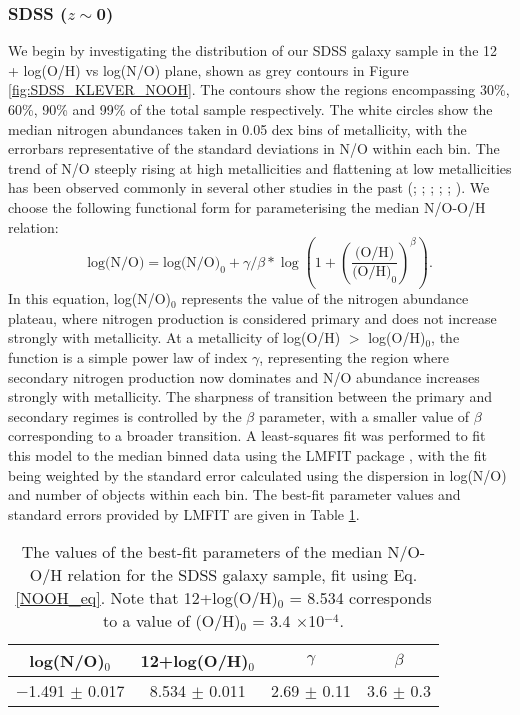 \documentclass[usenatbib]{mnras} %
\begin{document}
\subsubsection{SDSS ($z\sim$0)}
We begin by investigating the distribution of our SDSS galaxy sample in the 12 + log(O/H) vs log(N/O) plane, shown as grey contours in Figure \ref{fig:SDSS_KLEVER_NOOH}. The contours show the regions encompassing 30\%, 60\%, 90\% and 99\% of the total sample respectively. The white circles show the median nitrogen abundances taken in 0.05 dex bins of metallicity, with the errorbars representative of the standard deviations in N/O within each bin. The trend of N/O steeply rising at high metallicities and flattening at low metallicities has been observed commonly in several other studies in the past (\citealt{VilaCostas_1993}; \citealt{vanZee_1998}; \citealt{HenryWorthy_1999}; \citealt{PMC_2009}; \citealt{Pilyugin_2012}; \citealt{AndrewsMartini_2013}).
We choose the following functional form for parameterising the median N/O-O/H relation:
\begin{equation}\label{NOOH_eq}
\text{log(N/O)} = \text{log(N/O)}_0 + \gamma/\beta * \log\left(1 + \left(\frac{\text{(O/H)}}{\text{(O/H)}_0}\right)^\beta\right).
\end{equation}
In this equation, log(N/O)$_0$ represents the value of the nitrogen abundance plateau, where nitrogen production is considered primary and does not increase strongly with metallicity. At a metallicity of log(O/H) $>$ log(O/H)$_0$, the function is a simple power law of index $\gamma$, representing the region where secondary nitrogen production now dominates and N/O abundance increases strongly with metallicity. The sharpness of transition between the primary and secondary regimes is controlled by the $\beta$ parameter, with a smaller value of $\beta$ corresponding to a broader transition. A least-squares fit was performed to fit this model to the median binned data using the LMFIT package \citep[][]{Newville_2016}, with the fit being weighted by the standard error calculated using the dispersion in log(N/O) and number of objects within each bin. The best-fit parameter values and standard errors provided by LMFIT are given in Table \ref{tab:NOOH_best}. 

\begin{table}
 \centering
 \caption{The values of the best-fit parameters of the median N/O-O/H relation for the SDSS galaxy sample, fit using Eq. \ref{NOOH_eq}. Note that 12+log(O/H)$_0$ = 8.534 corresponds to a value of (O/H)$_0$ = 3.4 $\times$10$^{-4}$.}
 \label{tab:NOOH_best}
 \begin{tabular}{cccc}
  \hline
  \hline
  log(N/O)$_0$ & 12+log(O/H)$_0$ & $\gamma$ & $\beta$\\
  \hline
  $-$1.491 $\pm$ 0.017 & 8.534 $\pm$ 0.011 & 2.69 $\pm$ 0.11 & 3.6 $\pm$ 0.3\\[2pt]
  \hline
  \hline
 \end{tabular}
\end{table}
\end{document}
